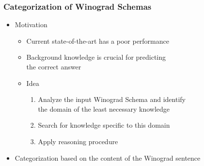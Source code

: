 \documentclass[c,8pt,xcolor...,x11names]{beamer}
\begin{document}
\begin{frame}[fragile]
\frametitle{Categorization of Winograd Schemas}

	\begin{itemize}		
	\normalsize
	\item Motivation
	\begin{itemize}
		\normalsize
		\item Current state-of-the-art has a poor performance
		\item Background knowledge is crucial for predicting\\ the correct answer 
		\onslide<2->			\item Idea
		\onslide<2->		\begin{enumerate}
			\normalsize 
			\item Analyze the input Winograd Schema and identify \\the domain of the \alert{least necessary} knowledge
			\item Search for knowledge \alert{specific} to this domain
			\item Apply reasoning procedure 
		
		\end{enumerate}
	\end{itemize}
	\item  Categorization based on the \alert{content} of the Winograd sentence
\end{itemize}   
\end{frame}
\end{document}
